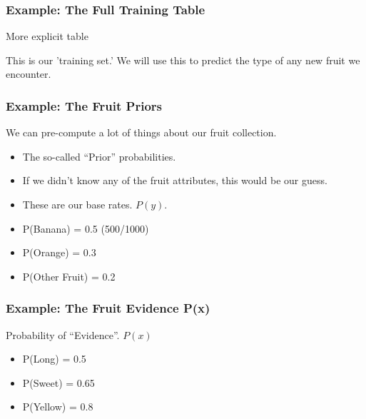 \begin{frame}[fragile]\frametitle{Example: The Full Training Table}
More explicit table
\begin{center}
\end{center}
This is our 'training set.' We will use this to predict the type of any new fruit we encounter.
\end{frame}

\begin{frame}[fragile]\frametitle{Example: The Fruit Priors}
We can pre-compute a lot of things about our fruit collection.
\begin{itemize}
\item     The so-called ``Prior'' probabilities. 
\item If we didn't know any of the fruit attributes, this would be our guess.
\item These are our base rates. $P(y)$.
\item P(Banana)      = 0.5 (500/1000)
\item  P(Orange)      = 0.3
\item  P(Other Fruit) = 0.2
\end{itemize}
\end{frame}

\begin{frame}[fragile]\frametitle{Example: The Fruit Evidence P(x)}
Probability of ``Evidence''. $P(x)$
\begin{itemize}
\item P(Long)   = 0.5
\item P(Sweet)  = 0.65
\item P(Yellow) = 0.8
\end{itemize}
\end{frame}


